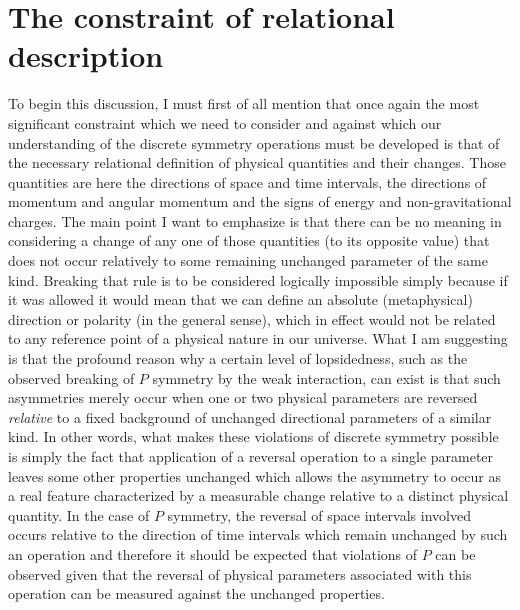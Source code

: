 \documentclass[notitlepage,12pt]{report}
\begin{document}
\section{The constraint of relational description}

To begin this discussion, I must first of all mention that once again the most significant constraint which we need to consider and against which our understanding of the discrete symmetry operations must be developed is that of the necessary relational definition of physical quantities and their changes. Those quantities are here the directions of space and time intervals, the directions of momentum and angular momentum and the signs of energy and non-gravitational charges. The main point I want to emphasize is that there can be no meaning in considering a change of any one of those quantities (to its opposite value) that does not occur relatively to some remaining unchanged parameter of the same kind. Breaking that rule is to be considered logically impossible simply because if it was allowed it would mean that we can define an absolute (metaphysical) direction or polarity (in the general sense), which in effect would not be related to any reference point of a physical nature in our universe. What I am suggesting is that the profound reason why a certain level of lopsidedness, such as the observed breaking of $P$ symmetry by the weak interaction, can exist is that such asymmetries merely occur when one or two physical parameters are reversed \textit{relative} to a fixed background of unchanged directional parameters of a similar kind. In other words, what makes these violations of discrete symmetry possible is simply the fact that application of a reversal operation to a single parameter leaves some other properties unchanged which allows the asymmetry to occur as a real feature characterized by a measurable change relative to a distinct physical quantity. In the case of $P$ symmetry, the reversal of space intervals involved occurs relative to the direction of time intervals which remain unchanged by such an operation and therefore it should be expected that violations of $P$ can be observed given that the reversal of physical parameters associated with this operation can be measured against the unchanged properties.
\end{document}

